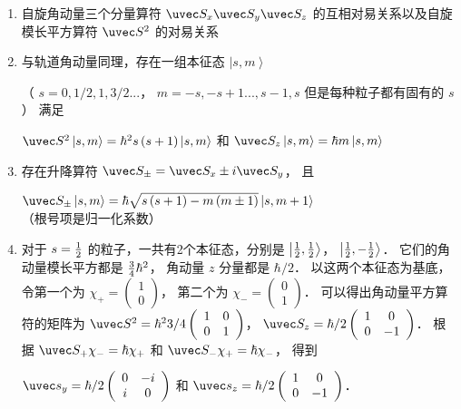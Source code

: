 
\begin{enumerate}
\item 自旋角动量三个分量算符 ${\uvec S_x}{\uvec S_y}{\uvec S_z}$ 的互相对易关系以及自旋模长平方算符 ${\uvec S^2}$ 的对易关系 %
\item 与轨道角动量同理，存在一组本征态 $\left| {s,m} \right\rangle $ 

（ $s = 0,{1}/{2},1,{3}/{2}...$， $m =  - s, - s + 1...,s - 1,s$ 但是每种粒子都有固有的 $s$ ） 满足

 ${\uvec S^2}\left| {s,m} \right\rangle  = {\hbar ^2}s\left( {s + 1} \right)\left| {s,m} \right\rangle $ 和 ${\uvec S_z}\left| {s,m} \right\rangle  = \hbar m\left| {s,m} \right\rangle $
\item 存在升降算符 ${\uvec S_ \pm } = {\uvec S_x} \pm i{\uvec S_y}$， 且

 ${\uvec S_ \pm }\left| {s,m} \right\rangle  = \hbar \sqrt {s\left( {s + 1} \right) - m\left( {m \pm 1} \right)} \left| {s,m + 1} \right\rangle $ （根号项是归一化系数）
\item 对于 $s = {\textstyle{1 \over 2}}$ 的粒子，一共有2个本征态，分别是 $\left| {{\textstyle{1 \over 2}},{\textstyle{1 \over 2}}} \right\rangle $，  $\left| {{\textstyle{1 \over 2}}, - {\textstyle{1 \over 2}}} \right\rangle $． 它们的角动量模长平方都是 ${\textstyle{3 \over 4}}{\hbar ^2}$， 角动量 $z$ 分量都是 ${\hbar }/{2}$．  以这两个本征态为基底，令第一个为  ${\chi _ + } = \left( {\begin{array}{*{20}{c}}
1\\
0
\end{array}} \right)$， 第二个为 ${\chi _ - } = \left( \begin{array}{l}
0\\
1
\end{array} \right)$． 可以得出角动量平方算符的矩阵为 ${\uvec S^2} = {\hbar ^2}{3}/{4}\left( {\begin{array}{*{20}{c}}
1&0\\
0&1
\end{array}} \right)$，   ${\uvec S_z} = {\hbar }/{2}\left( {\begin{array}{*{20}{c}}
1&0\\
0&{ - 1}
\end{array}} \right)$． 根据 ${\uvec S_ + }{\chi _ - } = \hbar {\chi _ + }$ 和 ${\uvec S_ - }{\chi _ + } = \hbar {\chi _ - }$，   得到

 ${\uvec s_y} = {\hbar }/{2}\left( {\begin{array}{*{20}{c}}
0&{ - i}\\
i&0
\end{array}} \right)$ 和 ${\uvec s_z} = {\hbar }/{2}\left( {\begin{array}{*{20}{c}}
1&0\\
0&{ - 1}
\end{array}} \right)$． 


\end{enumerate}
